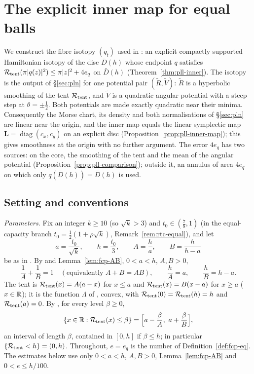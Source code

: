 \section{The explicit inner map for equal balls}\label{sec:pll}

We construct the fibre isotopy $(q_t)$ used in : an explicit compactly
supported Hamiltonian isotopy of the disc $\bar D(h)$ whose endpoint $q$ satisfies
$\mathcal{R}_{\rm tent}(\pi|q(z)|^2)\le\pi|z|^2+4e_q$ on $\bar D(h)$ (Theorem~\ref{thm:pll-inner}). The isotopy is the
output of \S\ref{sec:pln} for one potential pair $(\tilde R,\tilde V)$: $\tilde R$ is a hyperbolic smoothing of the
tent $\mathcal{R}_{\rm tent}$, and $\tilde V$ is a quadratic angular potential with a steep step at $\theta=\pm\frac12$. Both
potentials are made exactly quadratic near their minima. Consequently the Morse chart, its density and both
normalisations of \S\ref{sec:pln} are linear near the origin, and the inner map equals the linear symplectic map
$\mathbf L=\operatorname{diag}(c_x,c_y)$ on an explicit disc (Proposition~\ref{prop:pll-inner-map}); this gives
smoothness at the origin with no further argument. The error $4e_q$ has two sources: on the core, the smoothing
of the tent and the mean of the angular potential (Proposition~\ref{prop:pll-comparison}); outside it, an annulus
of area $4e_q$ on which only $q(\bar D(h))=\bar D(h)$ is used.

\subsection{Setting and conventions}\label{sec:pll-setting}

\emph{Parameters.} Fix an integer $k\ge10$ (so $\sqrt k>3$) and $t_0\in(\frac78,1)$ (in the equal-capacity branch
$t_0=\frac12(1+\rho\sqrt k)$, Remark~\ref{rem:rtc-equal}), and let
\[
 a=\frac{t_0}{\sqrt k},\qquad h=\frac{t_0}3,\qquad A=\frac ha,\qquad B=\frac h{h-a}
\]
be as in . By  and Lemma~\ref{lem:fcp-AB}, $0<a<h$, $A,B>0$,
\[
 \frac1A+\frac1B=1\quad(\text{equivalently }A+B=AB),\qquad \frac hA=a,\qquad \frac hB=h-a .
\]
The tent is $\mathcal{R}_{\rm tent}(x)=A(a-x)$ for $x\le a$ and $\mathcal{R}_{\rm tent}(x)=B(x-a)$ for $x\ge a$ ($x\in\mathbb{R}$); it is
the function $\Lambda$ of , convex, with $\mathcal{R}_{\rm tent}(0)=\mathcal{R}_{\rm tent}(h)=h$ and
$\mathcal{R}_{\rm tent}(a)=0$. By , for every level $\beta\ge0$,
\begin{equation}\label{eq:pll-sublevel}
 \{x\in\R:\Rcal_{\rm tent}(x)\le\beta\}=\Bigl[a-\frac\beta A,\ a+\frac\beta B\Bigr],
\end{equation}
an interval of length $\beta$, contained in $[0,h]$ if $\beta\le h$; in particular $\{\mathcal{R}_{\rm tent}<h\}=(0,h)$.
Throughout, $e=e_q$ is the number of Definition~\ref{def:fcp-eq}. The estimates below use only $0<a<h$, $A,B>0$,
Lemma~\ref{lem:fcp-AB} and $0<e\le h/100$.

